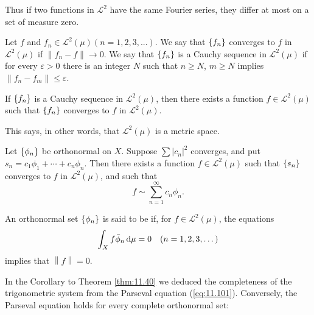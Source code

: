 Thus if two functions in $\mathscr{L}^2$ have the same Fourier series,
they differ at most on a set of measure zero.

\begin{mydef}
    \label{mydef:11.41}
    Let $f$ and $f_n \in \mathscr{L}^2(\mu) (n = 1, 2, 3, ... )$.
    We say that $\protect\{f_n\}$ converges to $f$ in $\mathscr{L}^2(\mu)$ if $\left\| f_n - f \right\| \rightarrow 0$.
    We say that $\protect\{f_n\}$ is a Cauchy sequence in $\mathscr{L}^2(\mu)$ if for every $\varepsilon > 0$ there is an integer $N$ such that $n \geq N$, $m \geq N$ implies $\left\| f_n - f_m \right\| \leq \varepsilon$.
\end{mydef}

\begin{thm}
    \label{thm:11.42}
    If $\protect\{f_n\}$ is a Cauchy sequence in $\mathscr{L}^2(\mu)$,
    then there exists a function $f \in \mathscr{L}^2(\mu)$
    such that $\protect\{f_n\}$ converges to $f$ in $\mathscr{L}^2(\mu)$.
\end{thm}

This says, in other words, that $\mathscr{L}^2(\mu)$ is a  metric space.

\begin{thm}
    \label{thm:11.43}
    Let $\protect\{\phi_n\}$ be orthonormal on $X$.
    Suppose $\sum \left| c_n \right|^2$ converges,
    and put $s_n = c_1 \phi_1 + \cdots + c_n\phi_n$.
    Then there exists a function $f \in \mathscr{L}^2(\mu)$
    such that $\protect\{s_n\}$ converges to $f$ in $\mathscr{L}^2(\mu)$,
    and such that
    \begin{equation*}
        f \sim \sum_{n=1}^{\infty}c_n \phi_n .
    \end{equation*}
\end{thm}

\begin{mydef}
    \label{mydef:11.44}
    An orthonormal set $\protect\{\phi_n\}$ is said to be  if, for $f \in \mathscr{L}^2(\mu)$, the equations
    \begin{equation*}
        \int_X f \bar{\phi}_n \d \mu = 0
        \quad (n = 1,2,3,\dots)
    \end{equation*}
    implies that $\left\| f \right\| = 0$.
\end{mydef}


In the Corollary to Theorem \ref{thm:11.40}
we deduced the completeness of the
trigonometric system from the Parseval equation (\ref{eq:11.101}).
Conversely, the Parseval
equation holds for every complete orthonormal set:

